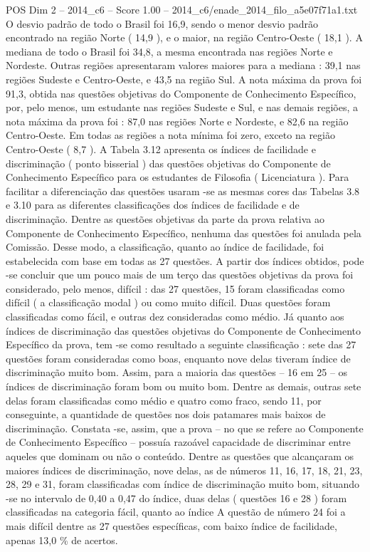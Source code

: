 \begin{textsample}{POS Dim 2 – 2014\_c6 – Score 1.00 – 2014\_c6/enade\_2014\_filo\_a5e07f71a1.txt}
O desvio padrão de todo o Brasil foi 16,9, sendo o menor desvio padrão encontrado na região Norte ( 14,9 ), e o maior, na região Centro-Oeste ( 18,1 ).
A mediana de todo o Brasil foi 34,8, a mesma encontrada nas regiões Norte e Nordeste.
Outras regiões apresentaram valores maiores para a mediana : 39,1 nas regiões Sudeste e Centro-Oeste, e 43,5 na região Sul.
A nota máxima da prova foi 91,3, obtida nas questões objetivas do Componente de Conhecimento Específico, por, pelo menos, um estudante nas regiões Sudeste e Sul, e nas demais regiões, a nota máxima da prova foi : 87,0 nas regiões Norte e Nordeste, e 82,6 na região Centro-Oeste.
Em todas as regiões a nota mínima foi zero, exceto na região Centro-Oeste ( 8,7 ).
A Tabela 3.12 apresenta os índices de facilidade e discriminação ( ponto bisserial ) das questões objetivas do Componente de Conhecimento Específico para os estudantes de Filosofia ( Licenciatura ).
Para facilitar a diferenciação das questões usaram -se as mesmas cores das Tabelas 3.8 e 3.10 para as diferentes classificações dos índices de facilidade e de discriminação.
Dentre as questões objetivas da parte da prova relativa ao Componente de Conhecimento Específico, nenhuma das questões foi anulada pela Comissão.
Desse modo, a classificação, quanto ao índice de facilidade, foi estabelecida com base em todas as 27 questões.
A partir dos índices obtidos, pode -se concluir que um pouco mais de um terço das questões objetivas da prova foi considerado, pelo menos, difícil : das 27 questões, 15 foram classificadas como difícil ( a classificação modal ) ou como muito difícil.
Duas questões foram classificadas como fácil, e outras dez consideradas como médio.
Já quanto aos índices de discriminação das questões objetivas do Componente de Conhecimento Específico da prova, tem -se como resultado a seguinte classificação : sete das 27 questões foram consideradas como boas, enquanto nove delas tiveram índice de discriminação muito bom.
Assim, para a maioria das questões – 16 em 25 – os índices de discriminação foram bom ou muito bom.
Dentre as demais, outras sete delas foram classificadas como médio e quatro como fraco, sendo 11, por conseguinte, a quantidade de questões nos dois patamares mais baixos de discriminação.
Constata -se, assim, que a prova – no que se refere ao Componente de Conhecimento Específico – possuía razoável capacidade de discriminar entre aqueles que dominam ou não o conteúdo.
Dentre as questões que alcançaram os maiores índices de discriminação, nove delas, as de números 11, 16, 17, 18, 21, 23, 28, 29 e 31, foram classificadas com índice de discriminação muito bom, situando -se no intervalo de 0,40 a 0,47 do índice, duas delas ( questões 16 e 28 ) foram classificadas na categoria fácil, quanto ao índice A questão de número 24 foi a mais difícil dentre as 27 questões específicas, com baixo índice de facilidade, apenas 13,0 \% de acertos.

\end{textsample}
